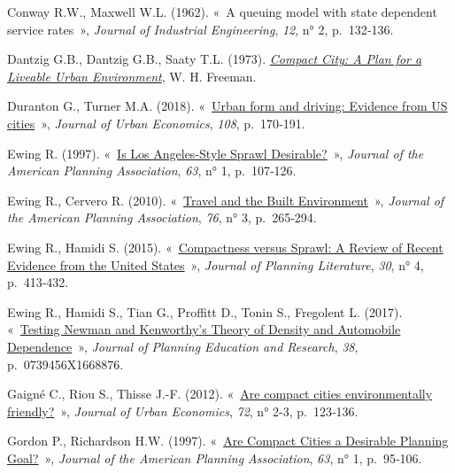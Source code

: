 \documentclass[
  9pt,
  a4paper,
  DIV=11]{scrreprt}
\newlength{\cslhangindent}
\newenvironment{CSLReferences}[2] %
 {\begin{list}{}{%
  \setlength{\itemindent}{0pt}
  \setlength{\leftmargin}{0pt}
  \setlength{\parsep}{0pt}
  \ifodd #1
   \setlength{\leftmargin}{\cslhangindent}
   \setlength{\itemindent}{-1\cslhangindent}
  \fi
  \setlength{\itemsep}{#2\baselineskip}}}
 {\end{list}}
\begin{document}
\begin{CSLReferences}{0}{1}
Conway R.W., Maxwell W.L. (1962). {«~A queuing model with state
dependent service rates~»}, \emph{Journal of Industrial Engineering},
\emph{12}, n° 2, p.~132‑136.

Dantzig G.B., Dantzig G.B., Saaty T.L. (1973).
\emph{\href{https://books.google.fr/books?id=PTeIQgAACAAJ}{Compact City:
A Plan for a Liveable Urban Environment}}, W. H. Freeman.

Duranton G., Turner M.A. (2018).
{«~\href{https://doi.org/10.1016/j.jue.2018.10.003}{Urban form and
driving: Evidence from US cities}~»}, \emph{Journal of Urban Economics},
\emph{108}, p.~170‑191.

Ewing R. (1997). {«~\href{https://doi.org/10.1080/01944369708975728}{Is
Los Angeles-Style Sprawl Desirable?}~»}, \emph{Journal of the American
Planning Association}, \emph{63}, n° 1, p.~107‑126.

Ewing R., Cervero R. (2010).
{«~\href{https://doi.org/10.1080/01944361003766766}{Travel and the Built
Environment}~»}, \emph{Journal of the American Planning Association},
\emph{76}, n° 3, p.~265‑294.

Ewing R., Hamidi S. (2015).
{«~\href{https://doi.org/10.1177/0885412215595439}{Compactness versus
Sprawl: A Review of Recent Evidence from the United States}~»},
\emph{Journal of Planning Literature}, \emph{30}, n° 4, p.~413‑432.

Ewing R., Hamidi S., Tian G., Proffitt D., Tonin S., Fregolent L.
(2017). {«~\href{https://doi.org/10.1177/0739456X16688767}{Testing
Newman and Kenworthy{'}s Theory of Density and Automobile
Dependence}~»}, \emph{Journal of Planning Education and Research},
\emph{38}, p.~0739456X1668876.

Gaigné C., Riou S., Thisse J.-F. (2012).
{«~\href{https://doi.org/10.1016/j.jue.2012.04.001}{Are compact cities
environmentally friendly?}~»}, \emph{Journal of Urban Economics},
\emph{72}, n° 2-3, p.~123‑136.

Gordon P., Richardson H.W. (1997).
{«~\href{https://doi.org/10.1080/01944369708975727}{Are Compact Cities a
Desirable Planning Goal?}~»}, \emph{Journal of the American Planning
Association}, \emph{63}, n° 1, p.~95‑106.


\end{CSLReferences}
\end{document}
